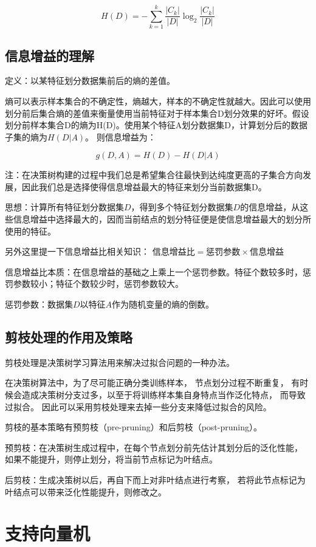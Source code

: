 $$
H(D)=-\sum_{k=1}^{k}\frac{|C_{k}|}{|D|}\log_{2}\frac{|C_{k}|}{|D|}
$$

\subsection{信息增益的理解}

定义：以某特征划分数据集前后的熵的差值。

熵可以表示样本集合的不确定性，熵越大，样本的不确定性就越大。因此可以使用划分前后集合熵的差值来衡量使用当前特征对于样本集合D划分效果的好坏。假设划分前样本集合D的熵为H(D)。使用某个特征A划分数据集D，计算划分后的数据子集的熵为$H(D|A)$。 则信息增益为：

$$
g(D,A)=H(D)-H(D|A)
$$

注：在决策树构建的过程中我们总是希望集合往最快到达纯度更高的子集合方向发展，因此我们总是选择使得信息增益最大的特征来划分当前数据集D。

思想：计算所有特征划分数据集$D$，得到多个特征划分数据集$D$的信息增益，从这些信息增益中选择最大的，因而当前结点的划分特征便是使信息增益最大的划分所使用的特征。

另外这里提一下信息增益比相关知识： $\mbox{信息增益比}=\mbox{惩罚参数}\times\mbox{信息增益}$

信息增益比本质：在信息增益的基础之上乘上一个惩罚参数。特征个数较多时，惩罚参数较小；特征个数较少时，惩罚参数较大。

惩罚参数：数据集$D$以特征$A$作为随机变量的熵的倒数。

\subsection{剪枝处理的作用及策略}

剪枝处理是决策树学习算法用来解决过拟合问题的一种办法。

在决策树算法中，为了尽可能正确分类训练样本， 节点划分过程不断重复， 有时候会造成决策树分支过多，以至于将训练样本集自身特点当作泛化特点， 而导致过拟合。 因此可以采用剪枝处理来去掉一些分支来降低过拟合的风险。

剪枝的基本策略有预剪枝（pre-pruning）和后剪枝（post-pruning）。

预剪枝：在决策树生成过程中，在每个节点划分前先估计其划分后的泛化性能， 如果不能提升，则停止划分，将当前节点标记为叶结点。

后剪枝：生成决策树以后，再自下而上对非叶结点进行考察， 若将此节点标记为叶结点可以带来泛化性能提升，则修改之。

\section{支持向量机}

